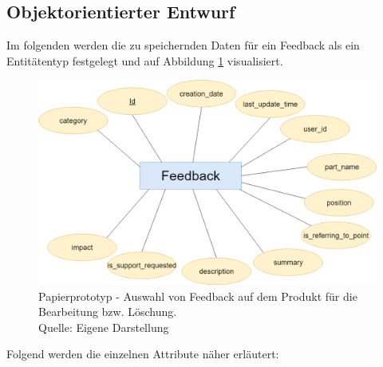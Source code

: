 \subsection{Objektorientierter Entwurf}\label{objentwurf}

Im folgenden werden die zu speichernden Daten für ein Feedback als ein Entitätentyp festgelegt und auf Abbildung \ref{img:entitytype} visualisiert. 

\begin{figure}[H]
	\centering
	\includegraphics[width=.85\textwidth]{resources/conception/feedback_entitiy_type.png}
	\caption{Papierprototyp - Auswahl von Feedback auf dem Produkt für die Bearbeitung bzw. Löschung. \\Quelle: Eigene Darstellung}
	\label{img:entitytype}
\end{figure}

Folgend werden die einzelnen Attribute näher erläutert: 

